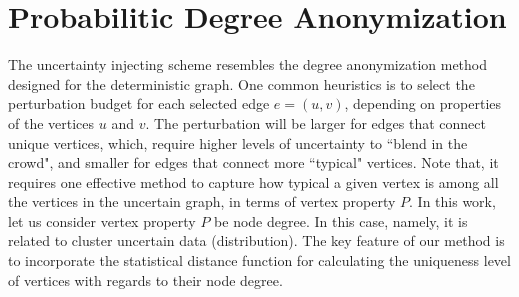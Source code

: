 \section{Probabilitic Degree Anonymization}
The uncertainty injecting scheme resembles the degree anonymization method designed for the deterministic graph. One common heuristics is to select the perturbation budget for each selected edge $e=(u,v)$, depending on properties of  the vertices $u$ and $v$. The perturbation will be larger for edges that connect unique vertices, which, require higher levels of uncertainty to ``blend in the crowd", and smaller for edges that connect more ``typical" vertices. Note that, it requires one effective method to capture how typical a given vertex is among all the vertices in the uncertain graph, in terms of vertex property $P$. In this work, let us consider vertex property $P$ be node degree. In this case, namely, it is related to cluster uncertain data (distribution). The key feature of our method is to incorporate the statistical distance function for calculating the uniqueness level of vertices with regards to their node degree. 

